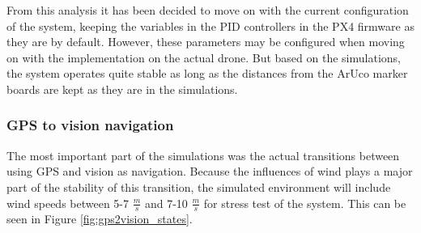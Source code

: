 \documentclass[../Head/report.tex]{subfiles}
\begin{document}
From this analysis it has been decided to move on with the current configuration of the system, keeping the variables in the PID controllers in the PX4 firmware as they are by default. However, these parameters may be configured when moving on with the implementation on the actual drone. But based on the simulations, the system operates quite stable as long as the distances from the ArUco marker boards are kept as they are in the simulations.   

\subsubsection{GPS to vision navigation}
\label{sec:gps2vision_transition}

The most important part of the simulations was the actual transitions between using GPS and vision as navigation. Because the influences of wind plays a major part of the stability of this transition, the simulated environment will include wind speeds between 5-7 $\frac{m}{s}$ and 7-10 $\frac{m}{s}$ for stress test of the system. This can be seen in Figure \ref{fig:gps2vision_states}. 
\end{document}

